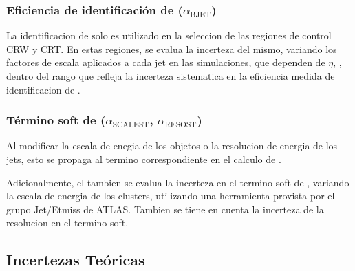 \subsubsection{Eficiencia de identificación de {\bjets} ($\alpha_\text{BJET}$)}

La identificacion de {\bjets} solo es utilizado en la seleccion de las regiones de control CRW y CRT.
En estas regiones, se evalua la incerteza del mismo, variando los factores de escala
aplicados a cada jet en las simulaciones, que dependen de $\eta$, {\pt}, dentro del rango
que refleja la incerteza sistematica en la eficiencia medida de identificacion de {\bjets}.




\subsubsection{Término soft de \MET ($\alpha_\text{SCALEST}$, $\alpha_\text{RESOST}$)}

Al modificar la escala de enegia de los objetos o la resolucion de energia de los jets, esto
se propaga al termino correspondiente en el calculo de {\met}.

Adicionalmente, el tambien se evalua la incerteza en el termino soft de {\met}, variando
la escala de energia de los clusters, utilizando una herramienta provista por
el grupo Jet/Etmiss de ATLAS. %
Tambien se tiene en cuenta la incerteza de la resolucion en el termino soft.





\subsection{Incertezas Teóricas}\label{sec:theosyst}


